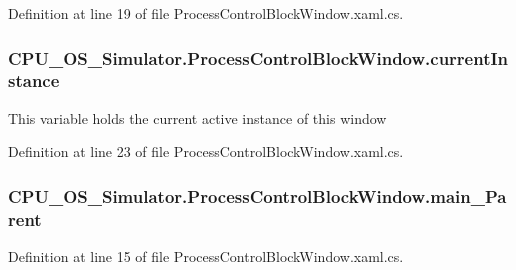 Definition at line 19 of file Process\+Control\+Block\+Window.\+xaml.\+cs.

\hypertarget{class_c_p_u___o_s___simulator_1_1_process_control_block_window_a88bea947f074426da083add43be70d48}{}
\subsubsection[{current\+Instance}]{ C\+P\+U\+\_\+\+O\+S\+\_\+\+Simulator.\+Process\+Control\+Block\+Window.\+current\+Instance\hspace{0.3cm}{\ttfamily [static]}}\label{class_c_p_u___o_s___simulator_1_1_process_control_block_window_a88bea947f074426da083add43be70d48}


This variable holds the current active instance of this window 



Definition at line 23 of file Process\+Control\+Block\+Window.\+xaml.\+cs.

\hypertarget{class_c_p_u___o_s___simulator_1_1_process_control_block_window_a928d5159874200e6ca0fad00913d65e5}{}
\subsubsection[{main\+\_\+\+Parent}]{ C\+P\+U\+\_\+\+O\+S\+\_\+\+Simulator.\+Process\+Control\+Block\+Window.\+main\+\_\+\+Parent\hspace{0.3cm}{\ttfamily [private]}}\label{class_c_p_u___o_s___simulator_1_1_process_control_block_window_a928d5159874200e6ca0fad00913d65e5}


Definition at line 15 of file Process\+Control\+Block\+Window.\+xaml.\+cs.


